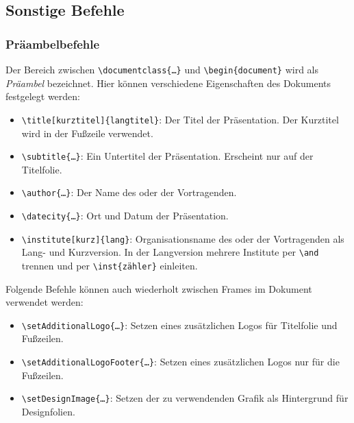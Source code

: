 \documentclass[german,notoc,draft]{tudbeamer}%
\begin{document}
\subsection{Sonstige Befehle}
\begin{frame}[fragile]
	\frametitle{Präambelbefehle}
	Der Bereich zwischen \texttt{\textbackslash documentclass\{\dots\}} und \texttt{\textbackslash begin\{document\}} wird als \emph{Präambel} bezeichnet. Hier können verschiedene Eigenschaften des Dokuments festgelegt werden:
	\begin{itemize}
		\item \texttt{\textbackslash title[kurztitel]\{langtitel\}}: Der Titel der Präsentation. Der Kurztitel wird in der Fußzeile verwendet.
		\item \texttt{\textbackslash subtitle\{\dots\}}: Ein Untertitel der Präsentation. Erscheint nur auf der Titelfolie.
		\item \texttt{\textbackslash author\{\dots\}}: Der Name des oder der Vortragenden.
		\item \texttt{\textbackslash datecity\{\dots\}}: Ort und Datum der Präsentation.
		\item \texttt{\textbackslash institute[kurz]\{lang\}}: Organisationsname des oder der Vortragenden als Lang- und Kurzversion. In der Langversion mehrere Institute per \texttt{\textbackslash and} trennen und per \texttt{\textbackslash inst\{zähler\}} einleiten.
	\end{itemize}
	Folgende Befehle können auch wiederholt zwischen Frames im Dokument verwendet werden:
	\begin{itemize}
		\item \texttt{\textbackslash setAdditionalLogo\{\dots\}}: Setzen eines zusätzlichen Logos für Titelfolie und Fußzeilen.
		\item \texttt{\textbackslash setAdditionalLogoFooter\{\dots\}}: Setzen eines zusätzlichen Logos nur für die Fußzeilen.
		\item \texttt{\textbackslash setDesignImage\{\dots\}}: Setzen der zu verwendenden Grafik als Hintergrund für Designfolien.
	\end{itemize}
\end{frame}
\end{document}
